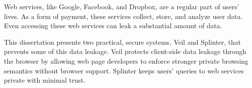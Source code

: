Web services, like Google, Facebook, and Dropbox, 
are a regular part of users' lives. 
As a form of payment, these services
collect, store, and analyze user data.
Even accessing these web services can leak a substantial
amount of data. 

This dissertation presents two practical,
secure systems, Veil and Splinter, that
prevents some of this data leakage. Veil protects 
client-side data leakage through the browser by allowing
web page developers to enforce stronger private browsing 
semantics without browser support. Splinter keeps users' 
queries to web services private with minimal trust.